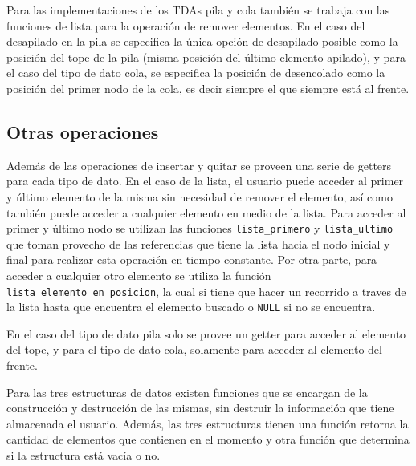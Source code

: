 \documentclass[titlepage,a4paper]{article}
\begin{document}
Para las implementaciones de los TDAs pila y cola también se trabaja con las funciones de lista para la operación de remover elementos. En el caso del desapilado en la pila se especifica la única opción de desapilado posible como la posición del tope de la pila (misma posición del último elemento apilado), y para el caso del tipo de dato cola, se especifica la posición de desencolado como la posición del primer nodo de la cola, es decir siempre el que siempre está al frente.

\subsection{Otras operaciones}

Además de las operaciones de insertar y quitar se proveen una serie de getters para cada tipo de dato. En el caso de la lista, el usuario puede acceder al primer y último elemento de la misma sin necesidad de remover el elemento, así como también puede acceder a cualquier elemento en medio de la lista. Para acceder al primer y último nodo se utilizan las funciones \lstinline{lista_primero} y \lstinline{lista_ultimo} que toman provecho de las referencias que tiene la lista hacia el nodo inicial y final para realizar esta operación en tiempo constante. Por otra parte, para acceder a cualquier otro elemento se utiliza la función \lstinline{lista_elemento_en_posicion}, la cual si tiene que hacer un recorrido a traves de la lista hasta que encuentra el elemento buscado o \lstinline{NULL} si no se encuentra.

En el caso del tipo de dato pila solo se provee un getter para acceder al elemento del tope, y para el tipo de dato cola, solamente para acceder al elemento del frente.

Para las tres estructuras de datos existen funciones que se encargan de la construcción y destrucción de las mismas, sin destruir la información que tiene almacenada el usuario. Además, las tres estructuras tienen una función retorna la cantidad de elementos que contienen en el momento y otra función que determina si la estructura está vacía o no.
\end{document}
